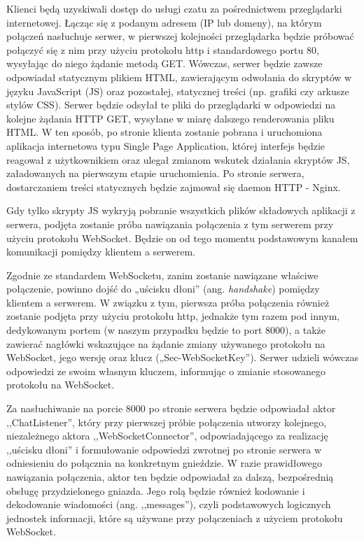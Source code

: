 \documentclass[11pt,oneside,a4paper,titlepage,onecolumn]{article}
\begin{document}
Klienci będą uzyskiwali dostęp do usługi czatu za pośrednictwem przeglądarki internetowej. Łącząc się z podanym adresem (IP lub domeny), 
na którym połączeń nasłuchuje serwer, w pierwszej kolejności przeglądarka będzie próbować połączyć się z nim przy użyciu protokołu http 
i standardowego portu 80, wysyłając do niego żądanie metodą GET. Wówczas, serwer będzie zawsze odpowiadał statycznym plikiem HTML, zawierającym 
odwołania do skryptów w języku JavaScript (JS) oraz pozostałej, statycznej treści (np. grafiki czy arkusze stylów CSS). Serwer będzie 
odsyłał te pliki do przeglądarki w odpowiedzi na kolejne żądania HTTP GET, wysyłane w miarę dalszego renderowania pliku HTML. W ten sposób, 
po stronie klienta zostanie pobrana i uruchomiona aplikacja internetowa typu Single Page Application, której interfejs będzie reagował z 
użytkownikiem oraz ulegał zmianom wskutek działania skryptów JS, załadowanych na pierwszym etapie uruchomienia. Po stronie serwera, 
dostarczaniem treści statycznych będzie zajmował się daemon HTTP - Nginx.

Gdy tylko skrypty JS wykryją pobranie wszystkich plików składowych aplikacji z serwera, podjęta zostanie próba nawiązania połączenia 
z tym serwerem przy użyciu protokołu WebSocket. Będzie on od tego momentu podstawowym kanałem komunikacji pomiędzy klientem a serwerem. 

Zgodnie ze standardem WebSocketu, zanim zostanie nawiązane właściwe połączenie, powinno dojść do „uścisku dłoni” (ang. \textit{handshake}) pomiędzy 
klientem a serwerem. W związku z tym, pierwsza próba połączenia również zostanie podjęta przy użyciu protokołu http, jednakże tym razem pod
innym, dedykowanym portem (w naszym przypadku będzie to port 8000), a także zawierać nagłówki wskazujące na żądanie zmiany używanego protokołu 
na WebSocket, jego wersję oraz klucz („Sec-WebSocketKey”). Serwer udzieli wówczas odpowiedzi ze swoim własnym kluczem, informując o zmianie 
stosowanego protokołu na WebSocket.

Za nasłuchiwanie na porcie 8000 po stronie serwera będzie odpowiadał aktor ,,ChatListener'', który przy pierwszej próbie połączenia 
utworzy kolejnego, niezależnego aktora ,,WebSocketConnector'', odpowiadającego za realizację ,,uścisku dłoni'' i formułowanie odpowiedzi zwrotnej 
po stronie serwera w odniesieniu do połącznia na konkretnym gnieździe. W razie prawidłowego nawiązania połączenia, aktor ten będzie odpowiadał 
za dalszą, bezpośrednią obsługę przydzielonego gniazda. Jego rolą będzie również kodowanie i dekodowanie wiadomości (ang.
,,messages''), czyli podstawowych logicznych jednostek informacji, które są używane przy połączeniach z użyciem protokołu WebSocket.
\end{document}
